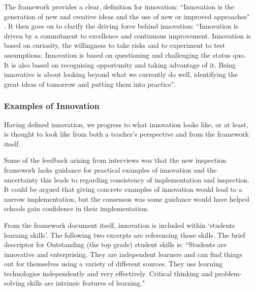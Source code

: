 \documentclass[11pt]{article}
\begin{document}
The framework provides a clear, definition for innovation: ``Innovation is the generation of new and creative ideas and the use of new or improved approaches" \cite[p. 12]{ADEC2016}. It then goes on to clarify the driving force behind innovation: ``Innovation is driven by a commitment to excellence and continuous improvement. Innovation is based on curiosity, the willingness to take risks and to experiment to test assumptions. Innovation is based on questioning and challenging the status quo. It is also based on recognising opportunity and taking advantage of it. Being innovative is about looking beyond what we currently do well, identifying the great ideas of tomorrow and putting them into practice".

\subsubsection{Examples of Innovation}

Having defined innovation, we progress to what innovation looks like, or at least, is thought to look like from both a teacher's perspective and from the framework itself.

Some of the feedback arising from interviews was that the new inspection framework lacks guidance for practical examples of innovation and the uncertainty this leads to regarding consistency of implementation and inspection. It could be argued that giving concrete examples of innovation would lead to a narrow implementation, but the consensus was some guidance would have helped schools gain confidence in their implementation.

From the framework document itself, innovation is included within `students learning skills'. The following two excerpts are referencing those skills. The brief descriptor for Outstanding (the top grade) student skills is: ``Students are innovative and enterprising. They are independent learners and can find things out for themselves using a variety of different sources. They use learning technologies independently and very effectively. Critical thinking and problem- solving skills are intrinsic features of learning." \cite[p. 33]{ADEC2016}
\end{document}
